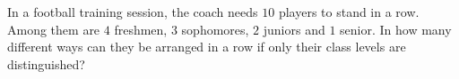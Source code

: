 In a football training session, the coach needs $10$ players to stand in a row. Among them are $4$ freshmen, $3$ sophomores, $2$ juniors and $1$ senior. In how many different ways can they be arranged in a row if only their class levels are distinguished?
